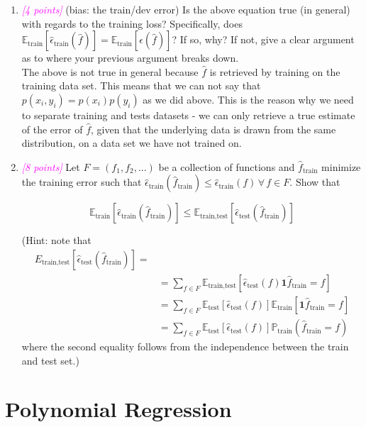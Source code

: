 \documentclass{article}
\newcommand{\1}{\mathbf{1}}
\newcommand{\E}{\mathbb{E}}
\renewcommand{\P}{\mathbb{P}}
\newcommand{\points}[1]{\small\textcolor{magenta}{\emph{[#1 points]}} \normalsize}
\begin{document}
\begin{enumerate}
    
    
    \item\points{4} (bias: the train/dev error) Is the above equation true (in general) with regards to the training loss? Specifically, does $\E_\text{train}[\widehat\epsilon_\text{train}(\hat f)] = \E_\text{train}[\epsilon(\hat f)]$? If so, why? If not, give a clear argument as to where your previous argument breaks down. \\
    
    The above is not true in general because $\hat f$ is retrieved by training on the training data set. This means that we can not say that $p(x_i,y_i) = p(x_i)p(y_i)$ as we did above. This is the reason why we need to separate training and tests datasets - we can only retrieve a true estimate of the error of $\hat f$, given that the underlying data is drawn from the same distribution, on a data set we have not trained on. 
    
    \item\points{8} Let $F = (f_1, f_2,...)$ be a collection of functions and $\hat f_\text{train}$ minimize the training error such that $\widehat\epsilon_\text{train}(\hat f_\text{train}) \leq \widehat\epsilon_\text{train}(f)\,\forall\,f \in F$. Show that 
    
    $$\E_\text{train}[\widehat\epsilon_\text{train}(\hat f_\text{train})] \leq \E_\text{train,test}[\widehat\epsilon_\text{test}(\hat f_\text{train})]$$
    
    (Hint:  note that
    \begin{align*}
        E_\text{train,test}[\widehat\epsilon_\text{test}(\hat f_\text{train})] =& \\
        &= \sum_{f \in F} \E_\text{train,test}[\widehat\epsilon_\text{test}(f)\1{\hat f_\text{train}=f}] \\
        &= \sum_{f \in F} \E_\text{test}[\widehat\epsilon_\text{test}(f)]\E_\text{train}[\1{\hat f_\text{train}=f}] \\ 
        &= \sum_{f \in F} \E_\text{test}[\widehat\epsilon_\text{test}(f)] \P_\text{train}(\hat f_\text{train}=f)
    \end{align*}
    where the second equality follows from the independence between the train and test set.)
\end{enumerate}

\newpage
\section*{Polynomial Regression}
\end{document}
